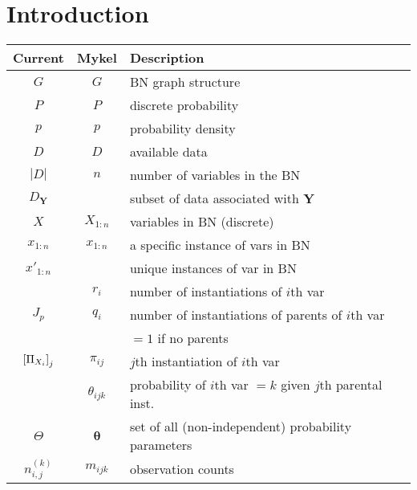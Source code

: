 \begin{abstract}
\end{abstract}


\section{Introduction}

\begin{table}[H]
  \centering
  \begin{tabular}{@{}ccl@{}}
    \toprule
    Current & Mykel & Description \\
    \midrule
    $G$ & $G$ & BN graph structure \\
    $P$ & $P$ & discrete probability \\
    $p$ & $p$ & probability density \\
    $D$ & $D$ & available data \\
    $|D|$ & $n$ & number of variables in the BN \\
    $D_{\bm{Y}}$ & & subset of data associated with $\bm{Y}$ \\
    $X$ & $X_{1:n}$ & variables in BN (discrete) \\
    $x_{1:n}$ & $x_{1:n}$ & a specific instance of vars in BN \\
    $x'_{1:n}$ &  & unique instances of var in BN \\
        & $r_i$ & number of instantiations of $i$th var \\
    $J_p$ & $q_i$ & number of instantiations of parents of $i$th var \\
        &       & $ = 1$ if no parents \\
    $\brock{\Pi_{X_i}}_j$ & $\pi_{ij}$ & $j$th instantiation of $i$th var \\
        & $\theta_{ijk}$ & probability of $i$th var $= k$ given $j$th parental inst. \\
    $\Theta$ & $\bm{\theta}$ & set of all (non-independent) probability parameters \\
    $n_{i,j}^{(k)}$ & $m_{ijk}$ & observation counts \\

\end{tabular}
\end{table}
